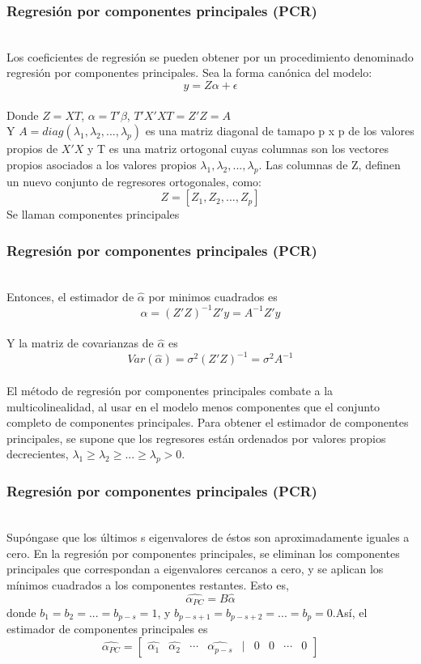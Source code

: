 \documentclass[12pt]{beamer}
\begin{document}
\begin{frame}
\frametitle{Regresión por componentes principales (PCR)}
~\\Los coeficientes de regresión se pueden obtener por un procedimiento denominado regresión por componentes principales. Sea la forma canónica del modelo:
$$y=Z\alpha+\epsilon$$
~\\Donde $Z=XT$, $\alpha=T'\beta$,  $T'X'XT=Z'Z=A$ 
~\\Y $A=diag(\lambda_{1},\lambda_{2},...,\lambda_{p})$ es una matriz diagonal de tamapo p x p de los valores propios de $X'X$ y T es una matriz ortogonal cuyas columnas son los vectores propios asociados a los valores propios $\lambda_{1},\lambda_{2},...,\lambda_{p}$. Las columnas de Z, definen un nuevo conjunto de regresores ortogonales, como:
$$Z=[Z_{1},Z_{2},...,Z_{p}]$$ Se llaman componentes principales
\end{frame}

\begin{frame}
\frametitle{Regresión por componentes principales (PCR)}
~\\Entonces, el estimador de $\hat{\alpha}$ por minimos cuadrados es
$$\hat{\alpha}=(Z'Z)^{-1}Z'y= A^{-1}Z'y$$
~\\Y la matriz de covarianzas de $\hat{\alpha}$ es 
$$Var(\hat{\alpha})=\sigma^2 (Z'Z)^{-1}=\sigma^2 A^{-1}$$
~\\El método de regresión por componentes principales combate a la multicolinealidad,
al usar en el modelo menos componentes que el conjunto completo de componentes principales. Para obtener el estimador de componentes principales, se supone que los regresores están ordenados por valores propios decrecientes, $\lambda_{1}\geq\lambda_{2}\geq...\geq\lambda_{p}>0$.
\end{frame}

\begin{frame}
\frametitle{Regresión por componentes principales (PCR)}
~\\Supóngase que los últimos s eigenvalores de éstos son aproximadamente iguales a cero. En la regresión por componentes principales, se eliminan los componentes principales que correspondan a eigenvalores cercanos a cero, y se aplican los mínimos cuadrados a los componentes restantes. Esto es,
$$\hat{\alpha_{PC}}=B\hat{\alpha}$$
donde $b_{1}=b_{2}=...=b_{p-s}=1$, y $b_{p-s+1}=b_{p-s+2}=...=b_{p}=0$.Así, el estimador de componentes principales es
$$\hat{\alpha_{PC}}=\left[\begin{matrix}
\hat{\alpha_{1}} & \hat{\alpha_{2}} & \cdots & \hat{\alpha_{p-s}} & | & 0 & 0 & \cdots & 0
\end{matrix}\right]$$ 
\end{frame}
\end{document}
